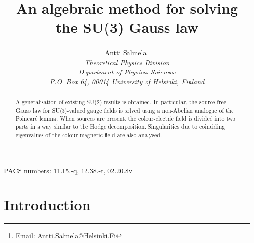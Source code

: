 \documentclass[a4paper,12pt]{article}
\begin{document}


\begin{titlepage}

\title{\bf An algebraic method for solving the SU(3) Gauss law}
\author{Antti Salmela\footnote{Email: Antti.Salmela@Helsinki.Fi} \\
\it Theoretical Physics Division \\ \it Department of Physical Sciences \\
\it P.O. Box 64, 00014 University of Helsinki, Finland}
\date{}

\maketitle

\begin{abstract} 

A generalisation of existing SU(2) results is obtained. In particular, the source-free Gauss law for SU(3)-valued gauge fields is solved using a non-Abelian analogue of the Poincar\'e lemma. When sources are present, the colour-electric field is divided into two parts in a way similar to the Hodge decomposition. Singularities due to coinciding eigenvalues of the colour-magnetic field are also analysed.

\end{abstract}

{\noindent PACS numbers: 11.15.-q, 12.38.-t, 02.20.Sv}

\end{titlepage}

\pagebreak

\section{Introduction}
\end{document}
